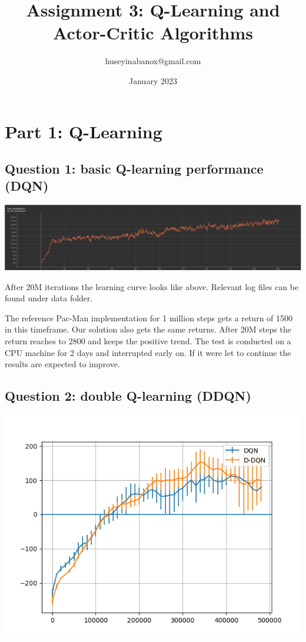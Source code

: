 \documentclass[11pt]{article}
\title{Assignment 3: Q-Learning and Actor-Critic Algorithms}
\author{huseyinabanox@gmail.com}
\date{January 2023}
\begin{document}
    \maketitle

    \section{Part 1: Q-Learning}

    \subsection*{Question 1: basic Q-learning performance (DQN)}

    \includegraphics[scale=0.8]{q1/packman-20M}

    After 20M iterations the learning curve looks like above.
    Relevant log files can be found under data folder.

    The reference Pac-Man implementation for 1 million steps gets a return of 1500 in this timeframe.
    Our solution also gets the same returns.
    After 20M steps the return reaches to 2800 and keeps the positive trend.
    The test is conducted on a CPU machine for 2 days and interrupted early on.
    If it were let to continue the results are expected to improve.

    \subsection*{Question 2: double Q-learning (DDQN)}

    \includegraphics[scale=0.8]{q2/q2}
\end{document}
